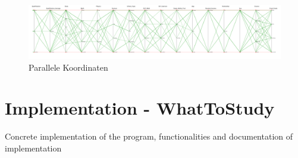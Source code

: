 \documentclass[%
	pdftex,
	oneside,        %
	11pt,           %
	parskip=half,   %
	headsepline,    %
	footsepline,    %
	abstracton,     %
	USenglish,      %
	a4paper,        %
]{report}
\begin{document}
\begin{landscape}
	\begin{figure}
		\includegraphics[width=\linewidth]{Parallel.png}
		\centering
		\caption{Parallele Koordinaten}
		\label{Parallel}
	\end{figure}
\end{landscape}


\chapter{Implementation - WhatToStudy}
Concrete implementation of the program, functionalities and documentation of implementation

%

\lstlistoflistings
\printbibliography

\begin{appendices}

%

\end{appendices}
\end{document}
